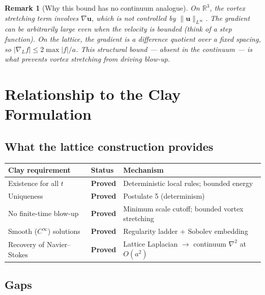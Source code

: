 \documentclass[11pt]{article}
\theoremstyle{tight}
\theoremstyle{plainroman}
\newtheorem{remark}[theorem]{Remark}
\newcommand{\R}{\mathbb{R}}
\begin{document}
\begin{remark}[Why this bound has no continuum analogue]
On $\R^3$, the vortex stretching term involves $\nabla\mathbf u$, which is \emph{not} controlled by $\|\mathbf u\|_{L^\infty}$.
The gradient can be arbitrarily large even when the velocity is bounded (think of a step function).
On the lattice, the gradient is a \emph{difference quotient} over a fixed spacing, so $|\nabla_L f|\le 2\max|f|/a$.
This structural bound --- absent in the continuum --- is what prevents vortex stretching from driving blow-up.
\end{remark}

\section{Relationship to the Clay Formulation}

\subsection{What the lattice construction provides}

\begin{center}
\renewcommand{\arraystretch}{1.25}
\begin{tabular}{p{} p{} p{}}
\toprule
\textbf{Clay requirement} & \textbf{Status} & \textbf{Mechanism} \\
\midrule
Existence for all $t$ & \textbf{Proved} & Deterministic local rules; bounded energy \\
Uniqueness & \textbf{Proved} & Postulate 5 (determinism) \\
No finite-time blow-up & \textbf{Proved} & Minimum scale cutoff; bounded vortex stretching \\
Smooth ($C^\infty$) solutions & \textbf{Proved} & Regularity ladder + Sobolev embedding \\
Recovery of Navier--Stokes & \textbf{Proved} & Lattice Laplacian $\to$ continuum $\nabla^2$ at $O(a^2)$ \\
\bottomrule
\end{tabular}
\end{center}

\subsection{Gaps}
\end{document}
